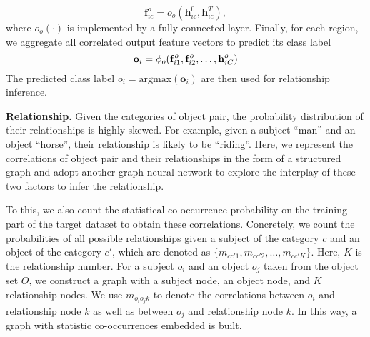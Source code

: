 \documentclass[10pt,twocolumn,letterpaper]{article}
\begin{document}
\begin{equation}
  \mathbf{f}_{ic}^o=o_o(\mathbf{h}_{ic}^0, \mathbf{h}_{ic}^T),
\end{equation}
where $o_o(\cdot)$ is implemented by a fully connected layer. Finally, for each region, we aggregate all correlated output feature vectors to predict its class label
\begin{equation}
   \mathbf{o}_i=\phi_{o}(\mathbf{f}_{i1}^{o}, \mathbf{f}_{i2}^{o}, \dots, \mathbf{h}_{iC}^{o})\\
   \label{eq:object-cls}
\end{equation}
The predicted class label $o_i=\mathrm{argmax}(\mathbf{o}_i)$ are then used for relationship inference.

\noindent\textbf{Relationship. }Given the categories of object pair, the probability distribution of their relationships is highly skewed. For example, given a subject ``man'' and an object ``horse'', their relationship is likely to be ``riding''. Here, we represent the correlations of object pair and their relationships in the form of a structured graph and adopt another graph neural network to explore the interplay of these two factors to infer the relationship. 

To this, we also count the statistical co-occurrence probability on the training part of the target dataset to obtain these correlations. Concretely, we count the probabilities of all possible relationships given a subject of the category $c$ and an object of the category $c'$, which are denoted as $\{m_{cc'1}, m_{cc'2}, \dots, m_{cc'K}\}$. Here, $K$ is the relationship number. For a subject $o_i$ and an object $o_j$ taken from the object set $O$, we construct a graph with a subject node, an object node, and $K$ relationship nodes. We use $m_{{o_i}{o_j}{k}}$ to denote the correlations between $o_i$ and relationship node $k$ as well as between $o_j$ and relationship node $k$. In this way, a graph with statistic co-occurrences embedded is built.
\end{document}

